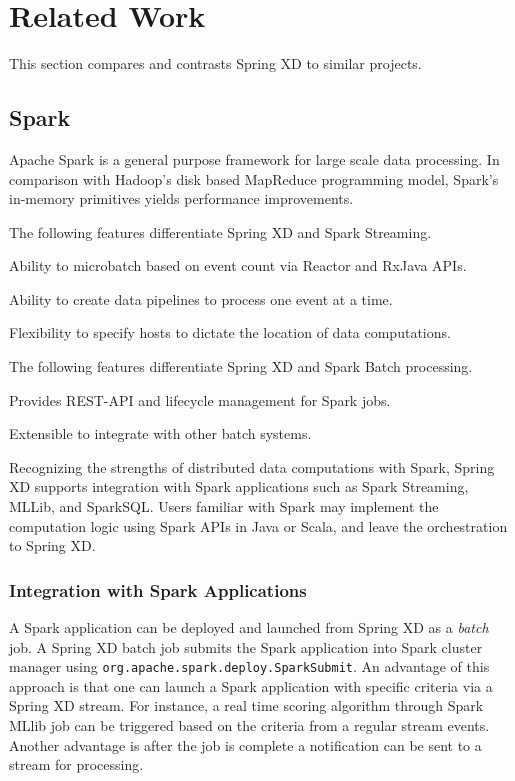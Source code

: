 \section{Related Work}
This section compares and contrasts Spring XD to similar projects.

\subsection{Spark}
\label{sec:Spark}
Apache Spark is a general purpose framework for large scale data processing.
In comparison with Hadoop's disk based MapReduce programming model, Spark's
in-memory primitives yields performance improvements.

The following features differentiate Spring XD and Spark Streaming.

\begin{itemize*}
\item Ability to microbatch based on event count via Reactor and RxJava APIs.
\item Ability to create data pipelines to process one event at a time.
\item Flexibility to specify hosts to dictate the location of data computations.
\end{itemize*}

The following features differentiate Spring XD and Spark Batch processing.

\begin{itemize*}
\item Provides REST-API and lifecycle management for Spark jobs.
\item Extensible to integrate with other batch systems.
\end{itemize*}

Recognizing the strengths of distributed data computations with Spark, Spring XD
supports integration with Spark applications such as Spark Streaming, MLLib, and
SparkSQL. Users familiar with Spark may implement the computation logic using
Spark APIs in Java or Scala, and leave the orchestration to Spring XD.

\subsubsection{Integration with Spark Applications}
A Spark application can be deployed and launched from Spring XD as
a \emph{batch} job. A Spring XD batch job submits the Spark application into
Spark cluster manager using \texttt{org.apache.spark.deploy.SparkSubmit}. An advantage
of this approach is that one can launch a Spark application with specific criteria
via a Spring XD stream. For instance, a real time scoring algorithm through Spark MLlib
job can be triggered based on the criteria from a regular stream events.
Another advantage is after the job is complete a notification can be sent to a
stream for processing.

